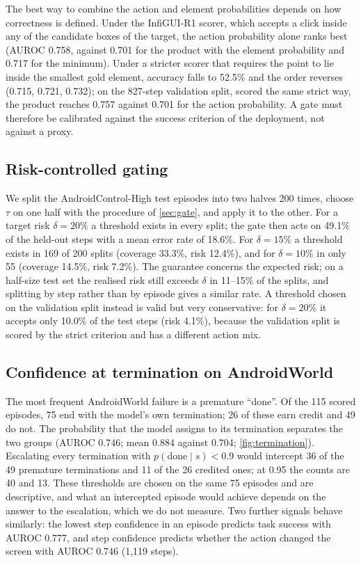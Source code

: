 \documentclass{article}
\begin{document}
The best way to combine the action and element probabilities depends on how correctness is defined. Under the
InfiGUI-R1 scorer, which accepts a click inside any of the candidate boxes of the target, the action probability
alone ranks best (AUROC 0.758, against 0.701 for the product with the element probability and 0.717 for the
minimum). Under a stricter scorer that requires the point to lie inside the smallest gold element, accuracy falls
to 52.5\% and the order reverses (0.715, 0.721, 0.732); on the 827-step validation split, scored the same strict
way, the product reaches 0.757 against 0.701 for the action probability. A gate must therefore be calibrated
against the success criterion of the deployment, not against a proxy.

\subsection{Risk-controlled gating}
We split the AndroidControl-High test episodes into two halves 200 times, choose $\tau$ on one half with the
procedure of \cref{sec:gate}, and apply it to the other. For a target risk $\delta = 20\%$ a threshold exists in
every split; the gate then acts on 49.1\% of the held-out steps with a mean error rate of 18.6\%. For
$\delta = 15\%$ a threshold exists in 169 of 200 splits (coverage 33.3\%, risk 12.4\%), and for $\delta = 10\%$
in only 55 (coverage 14.5\%, risk 7.2\%). The guarantee concerns the expected risk; on a half-size test set the
realised risk still exceeds $\delta$ in 11--15\% of the splits, and splitting by step rather than by episode
gives a similar rate. A threshold chosen on the validation split instead is valid but very conservative: for
$\delta = 20\%$ it accepts only 10.0\% of the test steps (risk 4.1\%), because the validation split is scored by
the strict criterion and has a different action mix.

\subsection{Confidence at termination on AndroidWorld}
The most frequent AndroidWorld failure is a premature ``done''. Of the 115 scored episodes, 75 end with the
model's own termination; 26 of these earn credit and 49 do not. The probability that the model assigns to its
termination separates the two groups (AUROC 0.746; mean 0.884 against 0.704; \cref{fig:termination}).
Escalating every termination with $p(\text{done}\mid s) < 0.9$ would intercept 36 of the 49 premature
terminations and 11 of the 26 credited ones; at 0.95 the counts are 40 and 13. These thresholds are chosen on
the same 75 episodes and are descriptive, and what an intercepted episode would achieve depends on the answer to
the escalation, which we do not measure. Two further signals behave similarly: the lowest step confidence in an
episode predicts task success with AUROC 0.777, and step confidence predicts whether the action changed the
screen with AUROC 0.746 (1{,}119 steps).
\end{document}
